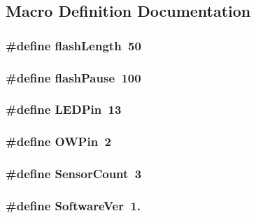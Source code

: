 \subsection{Macro Definition Documentation}
\hypertarget{OWGeneric_8ino_a65b6f41e12d2d8bdbd3416c8db11770e}{
\subsubsection[{flash\-Length}]{\setlength{\rightskip}{0pt plus 5cm}\#define flash\-Length~50}}\label{OWGeneric_8ino_a65b6f41e12d2d8bdbd3416c8db11770e}
\hypertarget{OWGeneric_8ino_ac71a92c90affb3d6a66641ac05f1545c}{
\subsubsection[{flash\-Pause}]{\setlength{\rightskip}{0pt plus 5cm}\#define flash\-Pause~100}}\label{OWGeneric_8ino_ac71a92c90affb3d6a66641ac05f1545c}
\hypertarget{OWGeneric_8ino_abd966e26c1237652c6c1dc46a8f14203}{
\subsubsection[{L\-E\-D\-Pin}]{\setlength{\rightskip}{0pt plus 5cm}\#define L\-E\-D\-Pin~13}}\label{OWGeneric_8ino_abd966e26c1237652c6c1dc46a8f14203}
\hypertarget{OWGeneric_8ino_a7f5aa1ac0711ae18877a165a9bf24625}{
\subsubsection[{O\-W\-Pin}]{\setlength{\rightskip}{0pt plus 5cm}\#define O\-W\-Pin~2}}\label{OWGeneric_8ino_a7f5aa1ac0711ae18877a165a9bf24625}
\hypertarget{OWGeneric_8ino_ab8efc8d6fc0797bbfe99a0797dd59029}{
\subsubsection[{Sensor\-Count}]{\setlength{\rightskip}{0pt plus 5cm}\#define Sensor\-Count~3}}\label{OWGeneric_8ino_ab8efc8d6fc0797bbfe99a0797dd59029}
\hypertarget{OWGeneric_8ino_a53a52b67d1aadf20dbeb5907cf7e86c7}{
\subsubsection[{Software\-Ver}]{\setlength{\rightskip}{0pt plus 5cm}\#define Software\-Ver~1.}}\label{OWGeneric_8ino_a53a52b67d1aadf20dbeb5907cf7e86c7}



